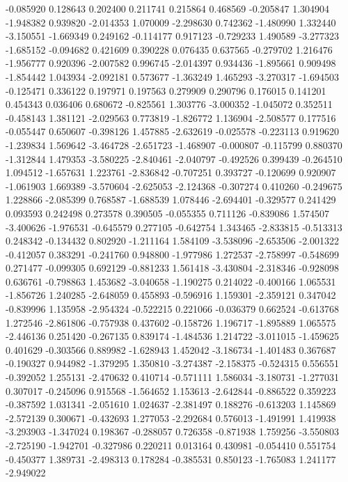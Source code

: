 -0.085920
0.128643
0.202400
0.211741
0.215864
0.468569
-0.205847
1.304904
-1.948382
0.939820
-2.014353
1.070009
-2.298630
0.742362
-1.480990
1.332440
-3.150551
-1.669349
0.249162
-0.114177
0.917123
-0.729233
1.490589
-3.277323
-1.685152
-0.094682
0.421609
0.390228
0.076435
0.637565
-0.279702
1.216476
-1.956777
0.920396
-2.007582
0.996745
-2.014397
0.934436
-1.895661
0.909498
-1.854442
1.043934
-2.092181
0.573677
-1.363249
1.465293
-3.270317
-1.694503
-0.125471
0.336122
0.197971
0.197563
0.279909
0.290796
0.176015
0.141201
0.454343
0.036406
0.680672
-0.825561
1.303776
-3.000352
-1.045072
0.352511
-0.458143
1.381121
-2.029563
0.773819
-1.826772
1.136904
-2.508577
0.177516
-0.055447
0.650607
-0.398126
1.457885
-2.632619
-0.025578
-0.223113
0.919620
-1.239834
1.569642
-3.464728
-2.651723
-1.468907
-0.000807
-0.115799
0.880370
-1.312844
1.479353
-3.580225
-2.840461
-2.040797
-0.492526
0.399439
-0.264510
1.094512
-1.657631
1.223761
-2.836842
-0.707251
0.393727
-0.120699
0.920907
-1.061903
1.669389
-3.570604
-2.625053
-2.124368
-0.307274
0.410260
-0.249675
1.228866
-2.085399
0.768587
-1.688539
1.078446
-2.694401
-0.329577
0.241429
0.093593
0.242498
0.273578
0.390505
-0.055355
0.711126
-0.839086
1.574507
-3.400626
-1.976531
-0.645579
0.277105
-0.642754
1.343465
-2.833815
-0.513313
0.248342
-0.134432
0.802920
-1.211164
1.584109
-3.538096
-2.653506
-2.001322
-0.412057
0.383291
-0.241760
0.948800
-1.977986
1.272537
-2.758997
-0.548699
0.271477
-0.099305
0.692129
-0.881233
1.561418
-3.430804
-2.318346
-0.928098
0.636761
-0.798863
1.453682
-3.040658
-1.190275
0.214022
-0.400166
1.065531
-1.856726
1.240285
-2.648059
0.455893
-0.596916
1.159301
-2.359121
0.347042
-0.839996
1.135958
-2.954324
-0.522215
0.221066
-0.036379
0.662524
-0.613768
1.272546
-2.861806
-0.757938
0.437602
-0.158726
1.196717
-1.895889
1.065575
-2.446136
0.251420
-0.267135
0.839174
-1.484536
1.214722
-3.011015
-1.459625
0.401629
-0.303566
0.889982
-1.628943
1.452042
-3.186734
-1.401483
0.367687
-0.190327
0.944982
-1.379295
1.350810
-3.274387
-2.158375
-0.524315
0.556551
-0.392052
1.255131
-2.470632
0.410714
-0.571111
1.586034
-3.180731
-1.277031
0.307017
-0.245096
0.915568
-1.564652
1.153613
-2.642844
-0.886522
0.359223
-0.387592
1.031341
-2.051610
1.024637
-2.381497
0.188276
-0.613203
1.145869
-2.572139
0.300671
-0.432693
1.277053
-2.292684
0.576013
-1.491991
1.419938
-3.293903
-1.347024
0.198367
-0.288057
0.726358
-0.871938
1.759256
-3.550803
-2.725190
-1.942701
-0.327986
0.220211
0.013164
0.430981
-0.054410
0.551754
-0.450377
1.389731
-2.498313
0.178284
-0.385531
0.850123
-1.765083
1.241177
-2.949022
